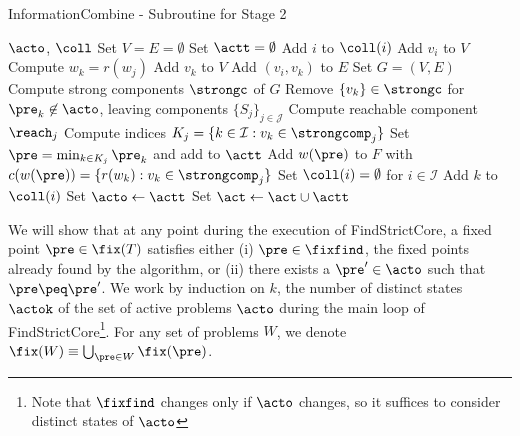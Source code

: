 \begin{algorithm}
\caption{InformationCombine - Subroutine for Stage 2}  
\label{infcomb}
\begin{algorithmic}[1]
\REQUIRE $\acto$, $\coll$
    \STATE Set $V = E = \emptyset$
    \STATE Set $\actt = \emptyset$
        \STATE Add $i$ to $\coll(i)$ \label{alg2:self_int}
        \STATE Add $v_i$ to $V$ \label{alg2:selfref}
            \STATE Compute $w_k = r(w_j)$ \label{alg2:rootbuild}
            \STATE Add $v_k$ to $V$
            \STATE Add $(v_i,v_k)$ to $E$ %
        \ENDFOR
    \ENDFOR
    \STATE Set  $G = (V,E)$
    \STATE Compute strong components $\strongc$  of $G$
    \STATE Remove $\{v_k\}\in \strongc$ for $\pre_k \not \in \acto$, leaving components $\{S_j\}_{j \in \mathcal{J}}$ \label{alg2:cstrong}
     \label{alg2:for2}
        \STATE Compute reachable component $\reach_j$ 
        \STATE Compute indices $K_j = \{k \in \mathcal{I}: v_k \in \strongcomp_j\}$ \label{alg2:indices}
        \STATE Set $\pre = \min_{k \in K_j} \pre_k$ and add to $\actt$
        \STATE Add $w(\pre)$ to $F$ with $c(w(\pre)) = \{r(w_k): v_k \in \strongcomp_j\}$ \label{alg2:forest}
    \ENDFOR
    \STATE Set $\coll(i) = \emptyset$ for $i \in \mathcal{I}$
             \label{alg2:collide}
                \STATE Add $k$ to $\coll(i)$ \label{alg2:coll2} 
            \ENDIF
        \ENDFOR
    \ENDFOR
    \STATE Set $\acto \leftarrow \actt$ 
    \STATE Set $\act \leftarrow \act \cup \actt$ \label{alg2:addq}
\RETURN{$(\acto,\coll)$} 
\end{algorithmic}
\end{algorithm}




\prf
We will show that at any point during the execution of FindStrictCore, a fixed point $\pre \in \fix(T)$ satisfies either (i) $\pre \in \fixfind$, the fixed points already found by the algorithm, or (ii) there exists a $\pre' \in \acto$ such that $\pre \peq \pre'$. 
We work by induction on $k$, the number of distinct states $\actok$ of the set of active problems $\acto$ during the main loop of FindStrictCore\footnote{Note that $\fixfind$ changes only if $\acto$ changes, so it suffices to consider distinct states of $\acto$}. 
For any set of problems $W$, we denote $\fix(W) \equiv \bigcup_{\pre \in W} \fix(\pre)$.

